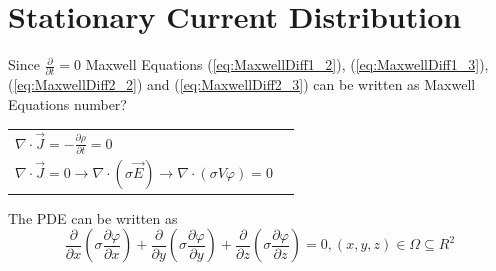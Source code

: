 \section{Stationary Current Distribution}

Since $\frac{\partial}{\partial t} = 0$ Maxwell Equations (\ref{eq:MaxwellDiff1_2}), (\ref{eq:MaxwellDiff1_3}), (\ref{eq:MaxwellDiff2_2}) and (\ref{eq:MaxwellDiff2_3}) can be written as \color{green}Maxwell Equations number?\color{black}

\begin{tabular}{ll}
	\(\displaystyle \nabla \cdot \vec{J} = -\frac{\partial \rho}{\partial t} =  0\) \\
	\(\displaystyle \nabla \cdot \vec{J} = 0 \rightarrow \nabla \cdot \left(\sigma \vec{E}\right) \rightarrow \nabla \cdot \left(\sigma V \varphi\right) = 0\) \\
\end{tabular}

The PDE can be written as
\begin{equation*}
	\frac{\partial}{\partial x}\left(\sigma \frac{\partial \varphi}{\partial x}\right) +\frac{\partial}{\partial y}\left(\sigma \frac{\partial \varphi}{\partial y}\right)
	+\frac{\partial}{\partial z}\left(\sigma \frac{\partial \varphi}{\partial z}\right) = 0, \left(x,y,z\right) \in \Omega \subseteq R^2
\end{equation*}

